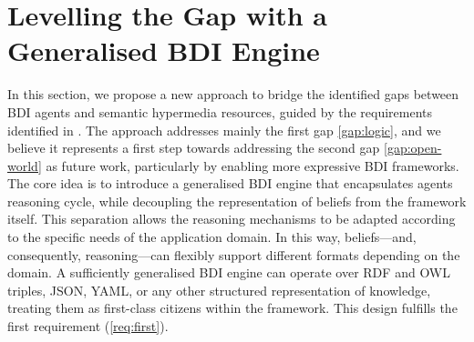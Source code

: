 \documentclass[
]{ceurart}
\begin{document}

\section{Levelling the Gap with a Generalised BDI Engine}
\label{sec:generalized-bdi-engine}

In this section,
we propose a new approach to bridge the identified gaps between \ac{BDI} agents and semantic hypermedia resources,
guided by the requirements identified in .
%
The approach addresses mainly the first gap \ref{gap:logic}, 
and we believe it represents a first step towards addressing the second gap \ref{gap:open-world} as future work,
particularly by enabling more expressive \ac{BDI} frameworks.
%
The core idea is to introduce a generalised \ac{BDI} engine that encapsulates agents reasoning cycle, 
while decoupling the representation of beliefs from the framework itself. 
%
This separation allows the reasoning mechanisms to be adapted according to the specific needs of the application domain.
%
In this way, beliefs---and, consequently, reasoning---can flexibly support different formats depending on the domain. 
%
A sufficiently generalised \ac{BDI} engine can operate over \ac{RDF} and \ac{OWL} triples, JSON, YAML, or any other structured representation of knowledge, treating them as first-class citizens within the framework. 
%
This design fulfills the first requirement (\ref{req:first}).
\end{document}
